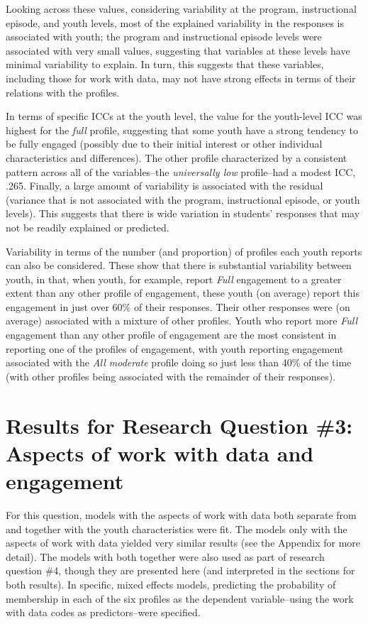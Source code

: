 \documentclass[]{msu-thesis}
\theoremstyle{definition}
\theoremstyle{definition}
\theoremstyle{definition}
\theoremstyle{remark}
\begin{document}
Looking across these values, considering variability at the program,
instructional episode, and youth levels, most of the explained
variability in the responses is associated with youth; the program and
instructional episode levels were associated with very small values,
suggesting that variables at these levels have minimal variability to
explain. In turn, this suggests that these variables, including those
for work with data, may not have strong effects in terms of their
relations with the profiles.

In terms of specific ICCs at the youth level, the value for the
youth-level ICC was highest for the \emph{full} profile, suggesting that
some youth have a strong tendency to be fully engaged (possibly due to
their initial interest or other individual characteristics and
differences). The other profile characterized by a consistent pattern
across all of the variables--the \emph{universally low} profile--had a
modest ICC, .265. Finally, a large amount of variability is associated
with the residual (variance that is not associated with the program,
instructional episode, or youth levels). This suggests that there is
wide variation in students' responses that may not be readily explained
or predicted.

Variability in terms of the number (and proportion) of profiles each
youth reports can also be considered. These show that there is
substantial variability between youth, in that, when youth, for example,
report \emph{Full} engagement to a greater extent than any other profile
of engagement, these youth (on average) report this engagement in just
over 60\% of their responses. Their other responses were (on average)
associated with a mixture of other profiles. Youth who report more
\emph{Full} engagement than any other profile of engagement are the most
consistent in reporting one of the profiles of engagement, with youth
reporting engagement associated with the \emph{All moderate} profile
doing so just less than 40\% of the time (with other profiles being
associated with the remainder of their responses).

\section{Results for Research Question \#3: Aspects of work with data
and
engagement}\label{results-for-research-question-3-aspects-of-work-with-data-and-engagement}

For this question, models with the aspects of work with data both
separate from and together with the youth characteristics were fit. The
models only with the aspects of work with data yielded very similar
results (see the Appendix for more detail). The models with both
together were also used as part of research question \#4, though they
are presented here (and interpreted in the sections for both results).
In specific, mixed effects models, predicting the probability of
membership in each of the six profiles as the dependent variable--using
the work with data codes as predictors--were specified.
\end{document}

